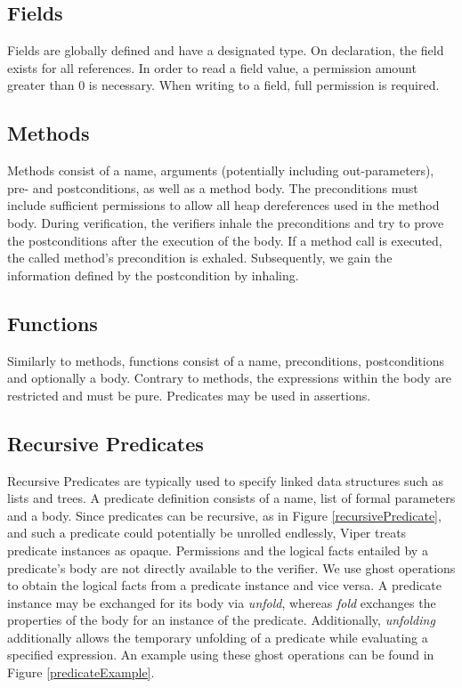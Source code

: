 \documentclass[12pt]{article}
\begin{document}
\subsection{Fields}
Fields are globally defined and have a designated type. On declaration, the field exists for all references. In order to read a field value, a permission amount greater than 0 is necessary. When writing to a field, full permission is required.

\subsection{Methods}
Methods consist of a name, arguments (potentially including out-parameters), pre- and postconditions, as well as a method body. The preconditions must include sufficient permissions to allow all heap dereferences used in the method body. During verification, the verifiers inhale the preconditions and try to prove the postconditions after the execution of the body. If a method call is executed, the called method's precondition is exhaled. Subsequently, we gain the information defined by the postcondition by inhaling.

\subsection{Functions}
Similarly to methods, functions consist of a name, preconditions, postconditions and optionally a body. Contrary to methods, the expressions within the body are restricted and must be pure. Predicates may be used in assertions.

\subsection{Recursive Predicates}

Recursive Predicates \cite{parkinson2005separation} are typically used to specify linked data structures such as lists and trees. A predicate definition consists of a name,  list of formal parameters and a body. Since predicates can be recursive, as in Figure \ref{recursivePredicate}, and such a predicate could potentially be unrolled endlessly, Viper treats predicate instances as opaque. Permissions and the logical facts entailed by a predicate's body are not directly available to the verifier. We use ghost operations to obtain the logical facts from a predicate instance and vice versa.
A predicate instance may be exchanged for its body via \textit{unfold}, whereas \textit{fold} exchanges the properties of the body for an instance of the predicate. Additionally, \textit{unfolding} additionally allows the temporary unfolding of a predicate while evaluating a specified expression. An example using these ghost operations can be found in Figure \ref{predicateExample}.
\end{document}
